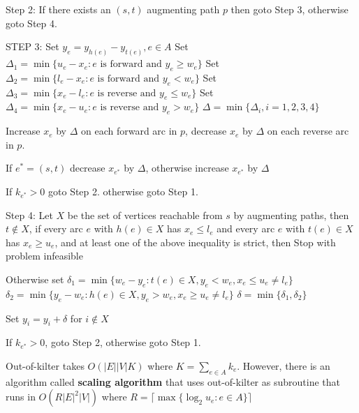 			Step 2: If there exists an $(s, t)$ augmenting path $p$ then goto Step 3, otherwise goto Step 4.

			STEP 3: Set $y_e = y_{h(e)} - y_{t(e)}, e\in A$
			Set $\Delta_1 = \min\{u_e - x_e: e \text{ is forward and } y_e \ge w_e\}$
			Set $\Delta_2 = \min\{l_e - x_e: e \text{ is forward and } y_e < w_e\}$
			Set $\Delta_3 = \min\{x_e - l_e: e \text{ is reverse and } y_e \le w_e\}$
			Set $\Delta_4 = \min\{x_e - u_e: e \text{ is reverse and } y_e > w_e\}$
			$\Delta = \min\{\Delta_i, i = 1, 2, 3, 4\}$

			Increase $x_e$ by $\Delta$ on each forward arc in $p$, decrease $x_e$ by $\Delta$ on each reverse arc in $p$.

			If $e^* = (s, t)$ decrease $x_{e^*}$ by $\Delta$, otherwise increase $x_{e^*}$ by $\Delta$

			If $k_{e^*} > 0$ goto Step 2. otherwise goto Step 1.

			Step 4: Let $X$ be the set of vertices reachable from $s$ by augmenting paths, then $t \notin X$, if every arc $e$ with $h(e) \in X$ has $x_e \le l_e$ and every arc $e$ with $t(e) \in X$ has $x_e \ge u_e$, and at least one of the above inequality is strict, then Stop with problem infeasible

			Otherwise set
			$\delta_1 = \min\{w_e - y_e: t(e) \in X, y_e < w_e, x_e \le u_e \neq l_e\}$
			$\delta_2 = \min\{y_e - w_e: h(e) \in X, y_e > w_e, x_e \ge u_e \neq l_e\}$
			$\delta = \min\{\delta_1, \delta_2\}$

			Set $y_i = y_i + \delta$ for $i \notin X$

			If $k_{e^*} > 0$, goto Step 2, otherwise goto Step 1.

			Out-of-kilter takes $O(|E||V|K)$ where $K = \sum_{e\in A} k_e$. However, there is an algorithm called \textbf{scaling algorithm} that uses out-of-kilter as subroutine that runs in $O(R|E|^2|V|)$ where $R = \lceil \max\{\log_2 u_e: e\in A\}\rceil$

